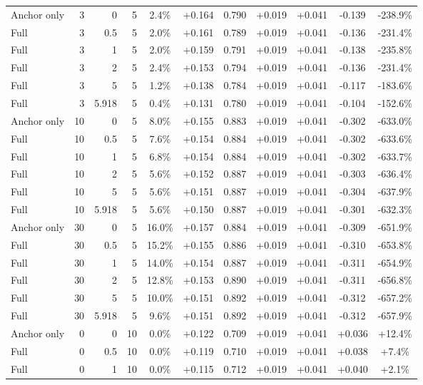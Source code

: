 \begin{table}[htbp]
\begin{tabular}{lrrrccccccc}
Anchor only & 3 & 0 & 5 & 2.4\% & +0.164 & 0.790 & +0.019 & +0.041 & -0.139 & -238.9\% \\
Full & 3 & 0.5 & 5 & 2.0\% & +0.161 & 0.789 & +0.019 & +0.041 & -0.136 & -231.4\% \\
Full & 3 & 1 & 5 & 2.0\% & +0.159 & 0.791 & +0.019 & +0.041 & -0.138 & -235.8\% \\
Full & 3 & 2 & 5 & 2.4\% & +0.153 & 0.794 & +0.019 & +0.041 & -0.136 & -231.4\% \\
Full & 3 & 5 & 5 & 1.2\% & +0.138 & 0.784 & +0.019 & +0.041 & -0.117 & -183.6\% \\
Full & 3 & 5.918 & 5 & 0.4\% & +0.131 & 0.780 & +0.019 & +0.041 & -0.104 & -152.6\% \\
Anchor only & 10 & 0 & 5 & 8.0\% & +0.155 & 0.883 & +0.019 & +0.041 & -0.302 & -633.0\% \\
Full & 10 & 0.5 & 5 & 7.6\% & +0.154 & 0.884 & +0.019 & +0.041 & -0.302 & -633.6\% \\
Full & 10 & 1 & 5 & 6.8\% & +0.154 & 0.884 & +0.019 & +0.041 & -0.302 & -633.7\% \\
Full & 10 & 2 & 5 & 5.6\% & +0.152 & 0.887 & +0.019 & +0.041 & -0.303 & -636.4\% \\
Full & 10 & 5 & 5 & 5.6\% & +0.151 & 0.887 & +0.019 & +0.041 & -0.304 & -637.9\% \\
Full & 10 & 5.918 & 5 & 5.6\% & +0.150 & 0.887 & +0.019 & +0.041 & -0.301 & -632.3\% \\
Anchor only & 30 & 0 & 5 & 16.0\% & +0.157 & 0.884 & +0.019 & +0.041 & -0.309 & -651.9\% \\
Full & 30 & 0.5 & 5 & 15.2\% & +0.155 & 0.886 & +0.019 & +0.041 & -0.310 & -653.8\% \\
Full & 30 & 1 & 5 & 14.0\% & +0.154 & 0.887 & +0.019 & +0.041 & -0.311 & -654.9\% \\
Full & 30 & 2 & 5 & 12.8\% & +0.153 & 0.890 & +0.019 & +0.041 & -0.311 & -656.8\% \\
Full & 30 & 5 & 5 & 10.0\% & +0.151 & 0.892 & +0.019 & +0.041 & -0.312 & -657.2\% \\
Full & 30 & 5.918 & 5 & 9.6\% & +0.151 & 0.892 & +0.019 & +0.041 & -0.312 & -657.9\% \\
Anchor only & 0 & 0 & 10 & 0.0\% & +0.122 & 0.709 & +0.019 & +0.041 & +0.036 & +12.4\% \\
Full & 0 & 0.5 & 10 & 0.0\% & +0.119 & 0.710 & +0.019 & +0.041 & +0.038 & +7.4\% \\
Full & 0 & 1 & 10 & 0.0\% & +0.115 & 0.712 & +0.019 & +0.041 & +0.040 & +2.1\% \\

\end{tabular}
\end{table}
